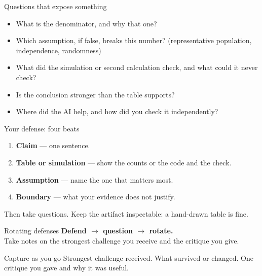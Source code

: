 \documentclass[aspectratio=169,10pt]{beamer}
\begin{document}
\begin{frame}{Questions that expose something}
\begin{itemize}
\item What is the denominator, and why that one?
\item Which assumption, if false, breaks this number? (representative population, independence, randomness)
\item What did the simulation or second calculation check, and what could it never check?
\item Is the conclusion stronger than the table supports?
\item Where did the AI help, and how did you check it independently?
\end{itemize}
\end{frame}

\begin{frame}{Your defense: four beats}
\begin{enumerate}
\item \textbf{Claim} --- one sentence.
\item \textbf{Table or simulation} --- show the counts or the code and the check.
\item \textbf{Assumption} --- name the one that matters most.
\item \textbf{Boundary} --- what your evidence does not justify.
\end{enumerate}
\vspace{2mm}
\small Then take questions. Keep the artifact inspectable: a hand-drawn table is fine.
\end{frame}

\begin{frame}{Rotating defenses}
\Large\centering
\textbf{Defend $\rightarrow$ question $\rightarrow$ rotate.}\\[4mm]
\normalsize
Take notes on the strongest challenge you receive and the critique you give.
\vspace{2mm}
\begin{block}{Capture as you go}
Strongest challenge received. What survived or changed. One critique you gave and why it was useful.
\end{block}
\end{frame}
\end{document}
